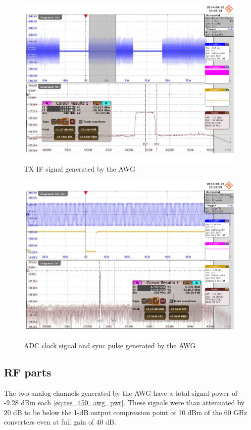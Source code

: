 \begin{figure}[p]
  \centering
  \includegraphics[width=\textwidth]{figures/osci/res_450_awg_analog}
  \caption{\gls{TX} \gls{IF} signal generated by the \gls{AWG}}
  \label{fig:res_450_awg_analog}
\end{figure}

\begin{figure}[p]
  \centering
  \includegraphics[width=\textwidth]{figures/osci/res_450_awg_digital}
  \caption{\gls{ADC} clock signal and sync pulse generated by the \gls{AWG}}
  \label{fig:res_450_awg_digital}
\end{figure}

\subsection{RF parts}
The two analog channels generated by the \gls{AWG} have a total signal
power of -9.28 dBm each \eqref{eq:res_450_awg_pwr}. These signals were
than attenuated by 20 dB to be below the 1-dB output compression point of 10 dBm
of the 60 GHz converters even at full gain of 40 dB. \\

